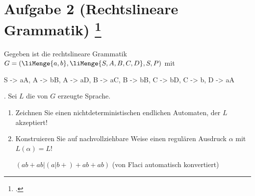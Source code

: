 \documentclass{lehramt-informatik-aufgabe}
\begin{document}
\let\m=\liMenge

\section{Aufgabe 2 (Rechtslineare Grammatik)
\footcite{46115:2019:09}}

Gegeben ist die rechtslineare Grammatik
$G = (\m{a, b}, \m{S, A, B, C, D}, S, P)$ mit
\begin{liProduktionsRegeln}
S -> aA,
A -> bB,
A -> aD,
B -> aC,
B -> bB,
C -> bD,
C -> b,
D -> aA
\end{liProduktionsRegeln}. Sei $L$ die von $G$ erzeugte Sprache.

\begin{enumerate}


\item Zeichnen Sie einen nichtdeterministischen endlichen Automaten, der
$L$ akzeptiert!

\begin{liAntwort}
\begin{center}
\end{center}
\end{liAntwort}


\item Konstruieren Sie auf nachvollziehbare Weise einen regulären
Ausdruck $\alpha$ mit $L(\alpha)=L$!

\begin{liAntwort}
$(ab+ab|(a|b+)+ab+ab)$
(von Flaci automatisch konvertiert)
\end{liAntwort}

\end{enumerate}
\end{document}
